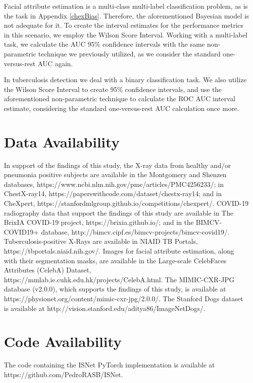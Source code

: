 \documentclass[fleqn,10pt]{wlscirep}
\begin{document}
{Facial attribute estimation is a multi-class multi-label classification problem, as is the task in Appendix \ref{chexBias}. Therefore, the aforementioned Bayesian model\cite{bayesianEstimator} is not adequate for it. To create the interval estimates for the performance metrics in this scenario, we employ the Wilson Score Interval. Working with a multi-label task, we calculate the AUC 95\% confidence intervals with the same non-parametric technique we previously utilized\cite{DeLongAUC}, as we consider the standard one-versus-rest AUC again.

In tuberculosis detection we deal with a binary classification task. We also utilize the Wilson Score Interval to create 95\% confidence intervals, and use the aforementioned non-parametric technique to calculate the ROC AUC interval estimate, considering the standard one-versus-rest AUC calculation once more\cite{DeLongAUC}. 



\section*{Data Availability}
In support of the findings of this study, the X-ray data from healthy and/or pneumonia positive subjects are available in the Montgomery and Shenzen databases, https://www.ncbi.nlm.nih.gov/pmc/articles/PMC4256233/; in ChestX-ray14, https://paperswithcode.com/dataset/chestx-ray14; and in CheXpert, https://stanfordmlgroup.github.io/competitions/chexpert/. COVID-19 radiography data that support the findings of this study are available in The BrixIA COVID-19 project, https://brixia.github.io/; and in the BIMCV-COVID19+ database, http://bimcv.cipf.es/bimcv-projects/bimcv-covid19/. Tuberculosis-positive X-Rays are available in NIAID TB Portals, https://tbportals.niaid.nih.gov/. Images for facial attribute estimation, along with their segmentation masks, are available in the Large-scale CelebFaces Attributes (CelebA) Dataset,  https://mmlab.ie.cuhk.edu.hk/projects/CelebA.html. The MIMIC-CXR-JPG database (v2.0.0), which supports the findings of this study, is available at https://physionet.org/content/mimic-cxr-jpg/2.0.0/. The Stanford Dogs dataset is available at http://vision.stanford.edu/aditya86/ImageNetDogs/.

\section*{Code Availability}
The code containing the ISNet PyTorch implementation is available at https://github.com/PedroRASB/ISNet.

}
\end{document}
